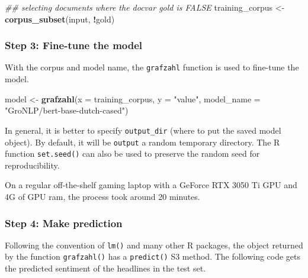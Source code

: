 \documentclass[
  english,
  man,floatsintext]{apa6}
\newenvironment{Shaded}{\begin{snugshade}}{\end{snugshade}}
\newcommand{\CommentTok}[1]{\textcolor[rgb]{0.56,0.35,0.01}{\textit{#1}}}
\newcommand{\DataTypeTok}[1]{\textcolor[rgb]{0.13,0.29,0.53}{#1}}
\newcommand{\KeywordTok}[1]{\textcolor[rgb]{0.13,0.29,0.53}{\textbf{#1}}}
\newcommand{\NormalTok}[1]{#1}
\newcommand{\OperatorTok}[1]{\textcolor[rgb]{0.81,0.36,0.00}{\textbf{#1}}}
\newcommand{\StringTok}[1]{\textcolor[rgb]{0.31,0.60,0.02}{#1}}
\begin{document}
\begin{Shaded}
\begin{Highlighting}[]
\CommentTok{\#\# selecting documents where the docvar \textasciigrave{}gold\textasciigrave{} is FALSE}
\NormalTok{training\_corpus \textless{}{-}}\StringTok{ }\KeywordTok{corpus\_subset}\NormalTok{(input, }\OperatorTok{!}\NormalTok{gold)}
\end{Highlighting}
\end{Shaded}

\hypertarget{step-3-fine-tune-the-model}{%
\subsubsection{Step 3: Fine-tune the model}\label{step-3-fine-tune-the-model}}

With the corpus and model name, the \texttt{grafzahl} function is used to fine-tune the model.

\begin{Shaded}
\begin{Highlighting}[]
\NormalTok{model \textless{}{-}}\StringTok{ }\KeywordTok{grafzahl}\NormalTok{(}\DataTypeTok{x =}\NormalTok{ training\_corpus,}
                  \DataTypeTok{y =} \StringTok{"value"}\NormalTok{,}
                  \DataTypeTok{model\_name =} \StringTok{"GroNLP/bert{-}base{-}dutch{-}cased"}\NormalTok{)}
\end{Highlighting}
\end{Shaded}

In general, it is better to specify \texttt{output\_dir} (where to put the saved model object). By default, it will be \texttt{output} a random temporary directory. The R function \texttt{set.seed()} can also be used to preserve the random seed for reproducibility.

On a regular off-the-shelf gaming laptop with a GeForce RTX 3050 Ti GPU and 4G of GPU ram, the process took around 20 minutes.

\hypertarget{step-4-make-prediction}{%
\subsubsection{Step 4: Make prediction}\label{step-4-make-prediction}}

Following the convention of \texttt{lm()} and many other R packages, the object returned by the function \texttt{grafzahl()} has a \texttt{predict()} S3 method. The following code gets the predicted sentiment of the headlines in the test set.
\end{document}
